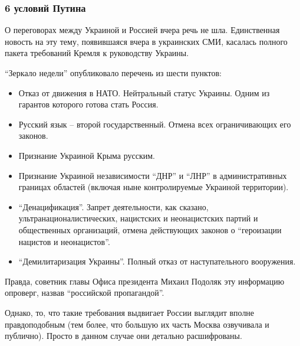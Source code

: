  
 
 
 
 

\subsubsection{6 условий Путина}

О переговорах между Украиной и Россией вчера речь не шла. Единственная новость
на эту тему, появившаяся вчера в украинских СМИ, касалась полного пакета
требований Кремля к руководству Украины.

\enquote{Зеркало недели} опубликовало перечень из шести пунктов:

\begin{itemize} %
\item Отказ от движения в НАТО. Нейтральный статус Украины. Одним из гарантов которого готова стать Россия.
    
\item Русский язык – второй государственный. Отмена всех ограничивающих его законов.
    
\item Признание Украиной Крыма русским.
    
\item Признание Украиной независимости \enquote{ДНР} и \enquote{ЛНР} в административных границах областей (включая ныне контролируемые Украиной территории).
    
\item \enquote{Денацификация}. Запрет деятельности, как сказано, ультранационалистических,
нацистских и неонацистских партий и общественных организаций, отмена
действующих законов о \enquote{героизации нацистов и неонацистов}.

\item \enquote{Демилитаризация Украины}. Полный отказ от наступательного вооружения.
\end{itemize} %

Правда, советник главы Офиса президента Михаил Подоляк эту информацию опроверг,
назвав \enquote{российской пропагандой}.

Однако, то, что такие требования выдвигает России выглядит вполне
правдоподобным (тем более, что большую их часть Москва озвучивала и публично).
Просто в данном случае они детально расшифрованы.


